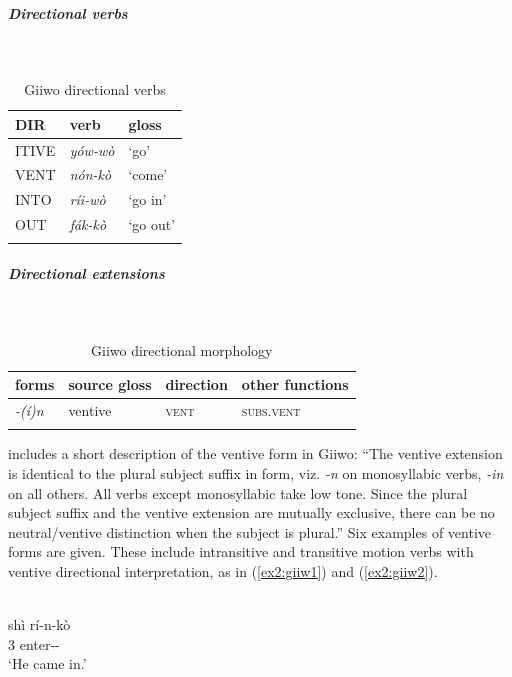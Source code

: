 \subparagraph{Directional verbs}~



\begin{table}[H]
	\caption{Giiwo directional verbs} 
	\label{tab:giiwV}
	\begin{tabular}{lll} %
		\lsptoprule
		DIR & verb & gloss   \\ %
		\midrule
		ITIVE & \textit{yów-wò} & `go' \\
		VENT & \textit{nón-kò} & `come' \\
		INTO & \textit{ríi-wò}  & `go in' \\
		OUT &  \textit{fák-kò}  & `go out' \\
		\lspbottomrule
	\end{tabular}
\end{table}

\subparagraph{Directional extensions}~



\begin{table}[H]
	\caption{Giiwo directional morphology}
	\label{tab:giiw}
	\begin{tabular}{llll} %
		\lsptoprule
		forms & source gloss & direction  & other functions  \\ %
		\midrule
		\textit{-(í)n}  &  ventive &   \textsc{vent}  &   \textsc{subs.vent}  \\
		\lspbottomrule
	\end{tabular}
\end{table} 

\citet[39]{schuhBoleTangaleLanguagesBauchi1978} includes a short description of the ventive form in Giiwo: ``The ventive extension is identical to the plural subject suffix in form, viz. \textit{-n} on monosyllabic verbs, \textit{-in} on all others. All verbs except monosyllabic take low tone. Since the plural subject suffix and the ventive extension are mutually exclusive, there can be no neutral/ventive distinction when the subject is plural.'' Six examples of ventive forms are given. These include intransitive and transitive motion verbs with ventive directional interpretation, as in (\ref{ex2:giiw1}) and (\ref{ex2:giiw2}). 

\ea\label{ex2:giiw1}
 \\
\gll shì	rí-n-kò \\
3	enter-- \\
\glt `He came in.'

